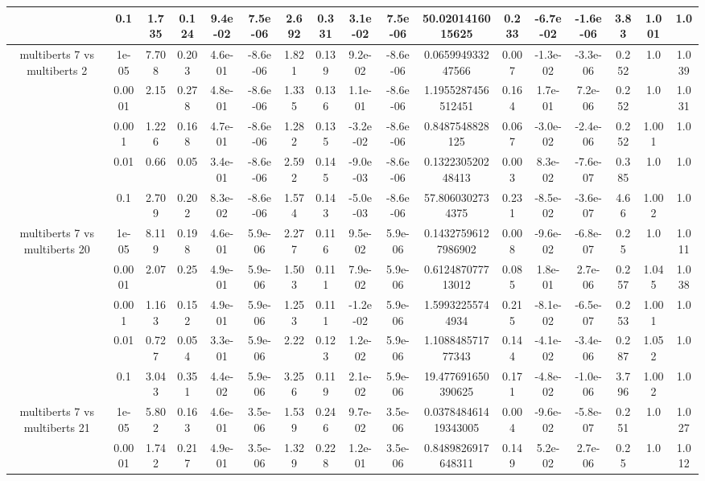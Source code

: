 \begin{tabular}{|c|c|c|c|c|c|c|c|c|c|c|c|c|c|c|c|c|}
 & 0.1 & 1.735 & 0.124 & 9.4e-02 & 7.5e-06 & 2.692 & 0.331 & 3.1e-02 & 7.5e-06 & 50.0201416015625 & 0.233 & -6.7e-02 & -1.6e-06 & 3.83 & 1.001 & 1.0 \\
\hline
\multirow{5}{*}{multiberts 7 vs multiberts 2} & 1e-05 & 7.708 & 0.203 & 4.6e-01 & -8.6e-06 & 1.821 & 0.139 & 9.2e-02 & -8.6e-06 & 0.065994933247566 & 0.007 & -1.3e-02 & -3.3e-06 & 0.252 & 1.0 & 1.039 \\
 & 0.0001 & 2.15 & 0.278 & 4.8e-01 & -8.6e-06 & 1.335 & 0.136 & 1.1e-01 & -8.6e-06 & 1.1955287456512451 & 0.164 & 1.7e-01 & 7.2e-06 & 0.252 & 1.0 & 1.031 \\
 & 0.001 & 1.226 & 0.168 & 4.7e-01 & -8.6e-06 & 1.282 & 0.135 & -3.2e-02 & -8.6e-06 & 0.8487548828125 & 0.067 & -3.0e-02 & -2.4e-06 & 0.252 & 1.001 & 1.0 \\
 & 0.01 & 0.66 & 0.05 & 3.4e-01 & -8.6e-06 & 2.592 & 0.145 & -9.0e-03 & -8.6e-06 & 0.132230520248413 & 0.003 & 8.3e-02 & -7.6e-07 & 0.385 & 1.0 & 1.0 \\
 & 0.1 & 2.709 & 0.202 & 8.3e-02 & -8.6e-06 & 1.574 & 0.143 & -5.0e-03 & -8.6e-06 & 57.8060302734375 & 0.231 & -8.5e-02 & -3.6e-07 & 4.66 & 1.002 & 1.0 \\
\hline
\multirow{5}{*}{multiberts 7 vs multiberts 20} & 1e-05 & 8.119 & 0.198 & 4.6e-01 & 5.9e-06 & 2.277 & 0.116 & 9.5e-02 & 5.9e-06 & 0.14327596127986902 & 0.008 & -9.6e-02 & -6.8e-07 & 0.25 & 1.0 & 1.011 \\
 & 0.0001 & 2.07 & 0.25 & 4.9e-01 & 5.9e-06 & 1.503 & 0.111 & 7.9e-02 & 5.9e-06 & 0.612487077713012 & 0.085 & 1.8e-01 & 2.7e-06 & 0.257 & 1.045 & 1.038 \\
 & 0.001 & 1.163 & 0.152 & 4.9e-01 & 5.9e-06 & 1.253 & 0.111 & -1.2e-02 & 5.9e-06 & 1.59932255744934 & 0.215 & -8.1e-02 & -6.5e-07 & 0.253 & 1.001 & 1.0 \\
 & 0.01 & 0.727 & 0.054 & 3.3e-01 & 5.9e-06 & 2.22 & 0.123 & 1.2e-02 & 5.9e-06 & 1.108848571777343 & 0.144 & -4.1e-02 & -3.4e-06 & 0.287 & 1.052 & 1.0 \\
 & 0.1 & 3.043 & 0.351 & 4.4e-02 & 5.9e-06 & 3.256 & 0.119 & 2.1e-02 & 5.9e-06 & 19.477691650390625 & 0.171 & -4.8e-02 & -1.0e-06 & 3.796 & 1.002 & 1.0 \\
\hline
\multirow{5}{*}{multiberts 7 vs multiberts 21} & 1e-05 & 5.802 & 0.163 & 4.6e-01 & 3.5e-06 & 1.539 & 0.246 & 9.7e-02 & 3.5e-06 & 0.037848461419343005 & 0.004 & -9.6e-02 & -5.8e-07 & 0.251 & 1.0 & 1.027 \\
 & 0.0001 & 1.742 & 0.217 & 4.9e-01 & 3.5e-06 & 1.329 & 0.228 & 1.2e-01 & 3.5e-06 & 0.8489826917648311 & 0.149 & 5.2e-02 & 2.7e-06 & 0.25 & 1.0 & 1.012 \\

\end{tabular}

